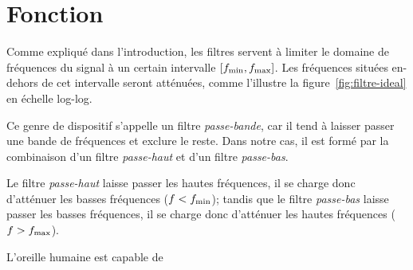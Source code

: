 \section{Fonction}

Comme expliqué dans l'introduction, les filtres servent à limiter
le domaine de fréquences du signal à un certain intervalle
$[f_{\mathrm{min}},f_{\mathrm{max}}]$.
Les fréquences situées en-dehors de cet intervalle seront atténuées,
comme l'illustre la figure~\ref{fig:filtre-ideal} en échelle log-log.

Ce genre de dispositif s'appelle un filtre \emph{passe-bande},
car il tend à laisser passer une bande de fréquences et exclure le reste.
Dans notre cas, il est formé par la combinaison d'un filtre
\emph{passe-haut} et d'un filtre \emph{passe-bas}.\cite{kanasewich1981time}

Le filtre \emph{passe-haut} laisse passer les hautes fréquences,
il se charge donc d'atténuer les basses fréquences ($f<f_{\mathrm{min}}$);
tandis que le filtre \emph{passe-bas} laisse passer les basses fréquences,
il se charge donc d'atténuer les hautes fréquences ($f>f_{\mathrm{max}}$).

L'oreille humaine est capable de

